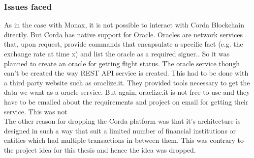 \subsubsection{Issues faced}
As in the case with Monax, it is not possible to interact with Corda Blockchain directly. But Corda has native support for Oracle. Oracles are network services that, upon request, provide commands that encapsulate a specific fact (e.g. the exchange rate at time x) and list the oracle as a required signer.\cite{OraclesDocumentation}. So it was planned to create an oracle for getting flight status. The oracle service though can't be created the way REST API service is created. This had to be done with a third party website such as oraclize.it. They provided tools necessary to get the data we want as a oracle service. But again, oraclize.it is not free to use and they have to be emailed about the requirements and project on email for getting their service. This was not %
\\The other reason for dropping the Corda platform was that it's architecture is designed in such a way that suit a limited number of financial institutions or entities which had multiple transactions in between them. This was contrary to the project idea for this thesis and hence the idea was dropped.


